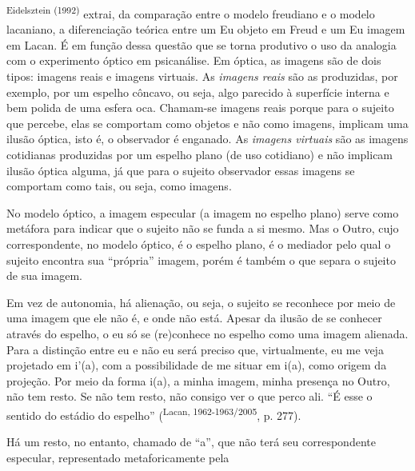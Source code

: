 \begin{multicols}{2}
\par{}\textsuperscript{Eidelsztein (\allowbreak{}1992)\allowbreak{}} extrai,\allowbreak{} da comparação entre o modelo freudiano e o modelo lacaniano,\allowbreak{} a diferenciação teórica entre um Eu objeto em Freud e um Eu imagem em Lacan.\allowbreak{} É em função dessa questão que se torna produtivo o uso da analogia com o experimento óptico em psicanálise.\allowbreak{} Em óptica,\allowbreak{} as imagens são de dois tipos:\allowbreak{} imagens reais e imagens virtuais.\allowbreak{} As \textit{imagens reais }são as produzidas,\allowbreak{} por exemplo,\allowbreak{} por um espelho côncavo,\allowbreak{} ou seja,\allowbreak{} algo parecido à superfície interna e bem polida de uma esfera oca.\allowbreak{} Chamam-\allowbreak{}se imagens reais porque para o sujeito que percebe,\allowbreak{} elas se comportam como objetos e não como imagens,\allowbreak{} implicam uma ilusão óptica,\allowbreak{} isto é,\allowbreak{} o observador é enganado.\allowbreak{} As \textit{imagens virtuais} são as imagens cotidianas produzidas por um espelho plano (\allowbreak{}de uso cotidiano)\allowbreak{} e não implicam ilusão óptica alguma,\allowbreak{} já que para o sujeito observador essas imagens se comportam como tais,\allowbreak{} ou seja,\allowbreak{} como imagens.\allowbreak{}\par{}No modelo óptico,\allowbreak{} a imagem especular (\allowbreak{}a imagem no espelho plano)\allowbreak{} serve como metáfora para indicar que o sujeito não se funda a si mesmo.\allowbreak{} Mas o Outro,\allowbreak{} cujo correspondente,\allowbreak{} no modelo óptico,\allowbreak{} é o espelho plano,\allowbreak{} é o mediador pelo qual o sujeito encontra sua “própria” imagem,\allowbreak{} porém é também o que separa o sujeito de sua imagem.\allowbreak{}\par{}Em vez de autonomia,\allowbreak{} há alienação,\allowbreak{} ou seja,\allowbreak{} o sujeito se reconhece por meio de uma imagem que ele não é,\allowbreak{} e onde não está.\allowbreak{} Apesar da ilusão de se conhecer através do espelho,\allowbreak{} o eu só se (\allowbreak{}re)\allowbreak{}conhece no espelho como uma imagem alienada.\allowbreak{} Para a distinção entre eu e não eu será preciso que,\allowbreak{} virtualmente,\allowbreak{} eu me veja projetado em i’(\allowbreak{}a)\allowbreak{},\allowbreak{} com a possibilidade de me situar em i(\allowbreak{}a)\allowbreak{},\allowbreak{} como origem da projeção.\allowbreak{} Por meio da forma i(\allowbreak{}a)\allowbreak{},\allowbreak{} a minha imagem,\allowbreak{} minha presença no Outro,\allowbreak{} não tem resto.\allowbreak{} Se não tem resto,\allowbreak{} não consigo ver o que perco ali.\allowbreak{} “É esse o sentido do estádio do espelho” (\allowbreak{}\textsuperscript{Lacan,\allowbreak{} 1962-\allowbreak{}1963\fshyp{}2005},\allowbreak{} p.\allowbreak{} 277)\allowbreak{}.\allowbreak{}\par{}Há um resto,\allowbreak{} no entanto,\allowbreak{} chamado de “a”,\allowbreak{} que não terá seu correspondente especular,\allowbreak{} representado metaforicamente pela 
\end{multicols}
